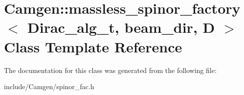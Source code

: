 \hypertarget{a00355}{\section{Camgen\-:\-:massless\-\_\-spinor\-\_\-factory$<$ Dirac\-\_\-alg\-\_\-t, beam\-\_\-dir, D $>$ Class Template Reference}
\label{a00355}
}


The documentation for this class was generated from the following file\-:\begin{DoxyCompactItemize}
\item 
include/\-Camgen/spinor\-\_\-fac.\-h\end{DoxyCompactItemize}
